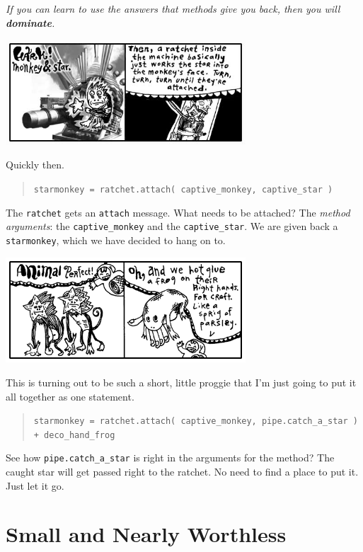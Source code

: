\documentclass[10pt,twoside]{report}
\begin{document}
{\em If you can learn to use the answers that methods give you back,
  then you will {\bf dominate}.}

	\includegraphics[width=0.6725\textwidth]{cache/25.png}

Quickly then.

\begin{quote}
\lstinline[breaklines=true]|starmonkey = ratchet.attach( captive_monkey, captive_star )|\end{quote}


The \lstinline[breaklines=true]|ratchet| gets an
\lstinline[breaklines=true]|attach| message.  What needs to be
attached?  The {\em method arguments}: the
\lstinline[breaklines=true]|captive_monkey| and the
\lstinline[breaklines=true]|captive_star|.  We are given back a
\lstinline[breaklines=true]|starmonkey|, which we have decided to hang
on to.

	\includegraphics[width=0.6725\textwidth]{cache/26.png}

This is turning out to be such a short, little proggie that I'm just
going to put it all together as one statement.

\begin{quote}
\lstinline[breaklines=true]|starmonkey = ratchet.attach( captive_monkey, pipe.catch_a_star ) + deco_hand_frog|\end{quote}


See how \lstinline[breaklines=true]|pipe.catch_a_star| is right in the
arguments for the method?  The caught star will get passed right to
the ratchet.  No need to find a place to put it.  Just let it go.


\section{Small and Nearly Worthless}
\end{document}
